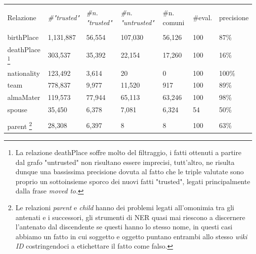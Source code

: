 \documentclass[10pt,a4paper,twocolumn]{article}
\begin{document}
\begin{table}[t]
	\centering
	\begin{minipage}{\textwidth}
	
		\begin{tabular}{lllllll}
		\hline \\
		Relazione & \textit{\#"trusted"} & \textit{\#n. "trusted"} & \textit{\#n. "untrusted"} & \#n. comuni & \#eval. & precisione \\
		\hline \\
		birthPlace           & 1,131,887            & 56,554                   & 107,030                    & 56,126       & 100        & 87\%       \\
		deathPlace \footnote{La relazione deathPlace soffre molto del filtraggio, i fatti ottenuti a partire dal grafo "untrusted" non risultano essere imprecisi, tutt'altro, ne risulta dunque una bassissima precisione dovuta al fatto che le triple valutate sono proprio un sottoinsieme sporco dei nuovi fatti "trusted", legati principalmente dalla frase \textit{moved to.}}           & 303,537              & 35,392                   & 22,154                     & 17,260       & 100        & 16\%       \\
		nationality          & 123,492              & 3,614                    & 20                         & 0            & 100        & 100\%      \\
		team                 & 778,837              & 9,977                    & 11,520                     & 917          & 100        & 89\%       \\
		almaMater           & 119,573              & 77,944                   & 65,113                     & 63,246       & 100        & 98\%       \\
		spouse               & 35,450               & 6,378                    & 7,081                      & 6,324        & 54         & 50\%       \\
		\hline \\
		parent \footnote{Le relazioni \textit{parent} e \textit{child} hanno dei problemi legati all'omonimia tra gli antenati e i successori, gli strumenti di NER quasi mai riescono a discernere l'antenato dal discendente se questi hanno lo stesso nome, in questi casi abbiamo un fatto in cui soggetto e oggetto puntano entrambi allo stesso \textit{wiki ID} costringendoci a etichettare il fatto come falso.}               & 28,308               & 6,397                    & 8                          & 8            & 100        & 63\%       \\

\end{tabular}
\end{minipage}
\end{table}
\end{document}
